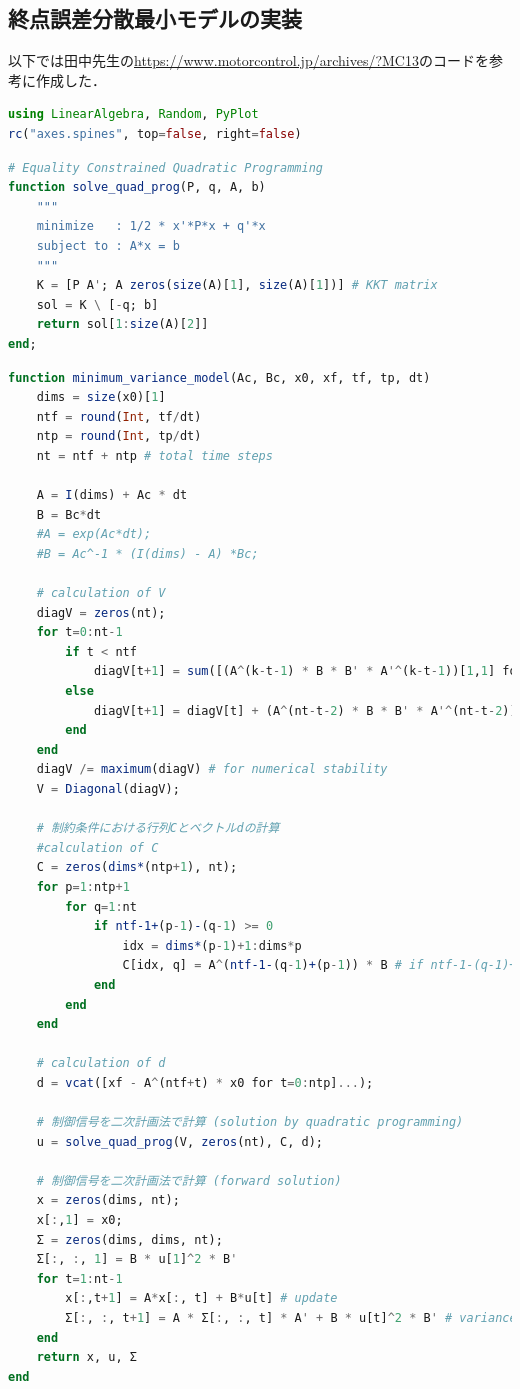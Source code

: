 \subsection{終点誤差分散最小モデルの実装}
以下では田中先生の\url{https://www.motorcontrol.jp/archives/?MC13}のコードを参考に作成した．
\begin{lstlisting}[language=julia]
using LinearAlgebra, Random, PyPlot
rc("axes.spines", top=false, right=false)
\end{lstlisting}
\begin{lstlisting}[language=julia]
# Equality Constrained Quadratic Programming
function solve_quad_prog(P, q, A, b)
    """
    minimize   : 1/2 * x'*P*x + q'*x
    subject to : A*x = b
    """
    K = [P A'; A zeros(size(A)[1], size(A)[1])] # KKT matrix
    sol = K \ [-q; b]
    return sol[1:size(A)[2]]
end;
\end{lstlisting}
\begin{lstlisting}[language=julia]
function minimum_variance_model(Ac, Bc, x0, xf, tf, tp, dt)
    dims = size(x0)[1]
    ntf = round(Int, tf/dt)
    ntp = round(Int, tp/dt)
    nt = ntf + ntp # total time steps    
    
    A = I(dims) + Ac * dt
    B = Bc*dt
    #A = exp(Ac*dt);
    #B = Ac^-1 * (I(dims) - A) *Bc; 
    
    # calculation of V
    diagV = zeros(nt);
    for t=0:nt-1
        if t < ntf
            diagV[t+1] = sum([(A^(k-t-1) * B * B' * A'^(k-t-1))[1,1] for k=ntf:nt-1])
        else
            diagV[t+1] = diagV[t] + (A^(nt-t-2) * B * B' * A'^(nt-t-2))[1,1]
        end
    end
    diagV /= maximum(diagV) # for numerical stability
    V = Diagonal(diagV); 
    
    # 制約条件における行列Cとベクトルdの計算
    #calculation of C
    C = zeros(dims*(ntp+1), nt);
    for p=1:ntp+1
        for q=1:nt
            if ntf-1+(p-1)-(q-1) >= 0
                idx = dims*(p-1)+1:dims*p
                C[idx, q] = A^(ntf-1-(q-1)+(p-1)) * B # if ntf-1-(q-1)+(p-1) == 0; A^(ntf-1-(q-1)+(p-1))*B equal to B
            end
        end
    end
    
    # calculation of d
    d = vcat([xf - A^(ntf+t) * x0 for t=0:ntp]...);
    
    # 制御信号を二次計画法で計算 (solution by quadratic programming)
    u = solve_quad_prog(V, zeros(nt), C, d);
    
    # 制御信号を二次計画法で計算 (forward solution)
    x = zeros(dims, nt);
    x[:,1] = x0;
    Σ = zeros(dims, dims, nt);
    Σ[:, :, 1] = B * u[1]^2 * B'
    for t=1:nt-1
        x[:,t+1] = A*x[:, t] + B*u[t] # update
        Σ[:, :, t+1] = A * Σ[:, :, t] * A' + B * u[t]^2 * B' # variance
    end
    return x, u, Σ
end
\end{lstlisting}
